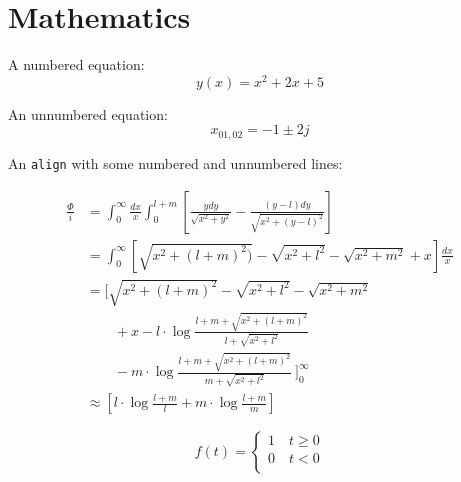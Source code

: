 \documentclass[a4paper,11pt,oneside,showtrims]{alpenthesis}
\begin{document}
\chapter{Mathematics} %

A numbered equation:
\begin{equation}
    y(x) = x^2 + 2x + 5
\end{equation}

An unnumbered equation:
\begin{equation*}
    x_{01,02} = -1 \pm 2j
\end{equation*}

An \verb|align| with some numbered and unnumbered lines:

\begin{align}
    \frac{\Phi}{i}
    & =
    \int_{0}^{\infty} \frac{dx}{x} \int_{0}^{l+m}
    \left[
        \frac{y dy}{\sqrt{x^2+y^2}} - \frac{(y-l) dy}{\sqrt{x^2+(y-l)^2}}
    \right]
    \nonumber
    \\
    &=
    \int_{0}^{\infty}
    \left[
        \sqrt{x^2 + (l+m)^2)} - \sqrt{x^2+l^2} - \sqrt{x^2+m^2}+x
    \right]
    \frac{dx}{x}
    \nonumber
    \\
    &=
    \Bigg[
        \sqrt{x^2 + (l+m)^2} - \sqrt{x^2+l^2} - \sqrt{x^2+m^2}
        \nonumber
        \\
        & ~~~~~~~~~   + x - l \cdot \log{\frac{l+m+\sqrt{x^2+(l+m)^2}}{l+\sqrt{x^2+l^2}}}
        \nonumber
        \\
        & ~~~~~~~~~   - m \cdot \log{\frac{l+m+\sqrt{x^2+(l+m)^2}}{m+\sqrt{x^2+l^2}}} ~
    \Bigg]_0^{\infty}
    \label{eq:mISL:2}
    \\
    & \approx
    \left[ l \cdot \log{\frac{l+m}{l}} + m \cdot \log{\frac{l+m}{m}} \right]
    \label{eq:mISL:3}
\end{align}

\begin{equation}
    f(t) =
    \begin{cases}
        1 \quad t \geq 0\\
        0 \quad t < 0\\
    \end{cases}
\end{equation}

\cleardoublepage
\begin{titlingpage*}
    \begin{vplace}
        \flushright\Huge\bfseries\sffamily\appendixpagename
    \end{vplace}
\end{titlingpage*}
\appendix
{}
\end{document}
